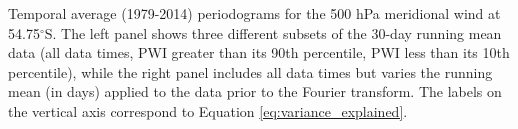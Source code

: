 \label{fig:periodograms}
Temporal average (1979-2014) periodograms for the 500 hPa meridional wind at 54.75$^{\circ}$S. The left panel shows three different subsets of the 30-day running mean data (all data times, PWI greater than its 90th percentile, PWI less than its 10th percentile), while the right panel includes all data times but varies the running mean (in days) applied to the data prior to the Fourier transform. The labels on the vertical axis correspond to Equation \ref{eq:variance_explained}. 